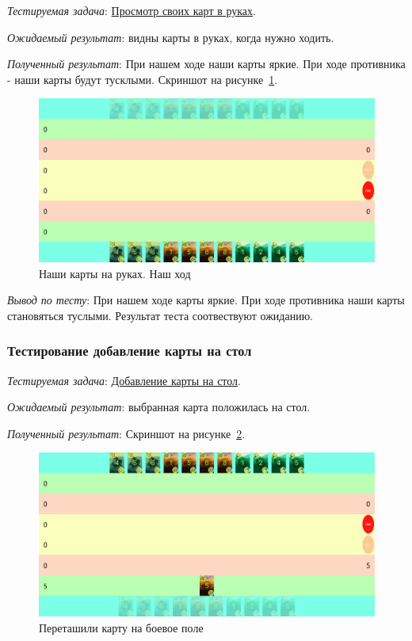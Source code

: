 \documentclass[12pt, a4paper, simple]{eskdtext}
\begin{document}
    \textit{Тестируемая задача}: \underline{Просмотр своих карт в руках}.
    
    \textit{Ожидаемый результат}: видны карты в руках, когда нужно ходить.

    \textit{Полученный результат}: При нашем ходе наши карты яркие.
    При ходе противника - наши карты будут тусклыми.
    Скриншот на рисунке~\ref{fig:test_start_game}.

    \begin{figure}[!h]
        \centering
        \includegraphics[width=16cm]
            {_assets/start_game.png}
        \caption{Наши карты на руках. Наш ход}
        \label{fig:test_start_game}
    \end{figure}

    \textit{Вывод по тесту}: При нашем ходе карты яркие. При ходе противника наши карты становяться туслыми.
    Результат теста соотвествуют ожиданию.

    \subsubsection*{Тестирование добавление карты на стол}

    \textit{Тестируемая задача}: \underline{Добавление карты на стол}.
    
    \textit{Ожидаемый результат}: выбранная карта положилась на стол.

    \textit{Полученный результат}: Скриншот на рисунке~\ref{fig:test_made_fisrt_step}.

    \begin{figure}[!h]
        \centering
        \includegraphics[width=16cm]
            {_assets/made_fisrt_step.png}
        \caption{Переташили карту на боевое поле}
        \label{fig:test_made_fisrt_step}
    \end{figure}
\end{document}
